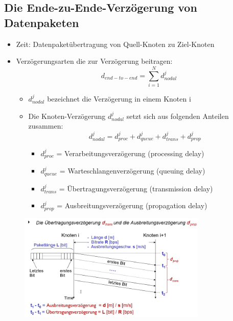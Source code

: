 \documentclass{scrreprt}
\begin{document}
\subsection*{Die Ende-zu-Ende-Verzögerung von Datenpaketen}
\begin{itemize}
	\item Zeit: Datenpaketübertragung von Quell-Knoten zu Ziel-Knoten
	\item Verzögerungsarten die zur Verzögerung beitragen:
	      \\$$d_{end-to-end} = \sum_{i=1}^{N}{d^{j}_{nodal}}$$
	      \begin{itemize}
		      \item $d^{j}_{nodal}$ bezeichnet die Verzögerung in einem Knoten i
		      \item Die Knoten-Verzögerung $d^{j}_{nodal}$ setzt sich aus folgenden Anteilen zusammen:
		            \\$$d^{j}_{nodal} = d^{j}_{proc}+d^{j}_{queue}+d^{j}_{trans}+d^{j}_{prop}$$
		            \begin{itemize}
			            \item $d^{j}_{proc}$ = Verarbeitungsverzögerung (processing delay)
			            \item $d^{j}_{queue}$ = Warteschlangenverzögerung (queuing delay)
			            \item $d^{j}_{trans}$ = Übertragungsverzögerung (transmission delay)
			            \item $d^{j}_{prop}$ = Ausbreitungsverzögerung (propagation delay)
		            \end{itemize}
	      \end{itemize}
\end{itemize}
\begin{figure}[h]
	\includegraphics[width=0.80\textwidth]{"graphics/Uebertragung"}
	\centering
\end{figure}
\end{document}
